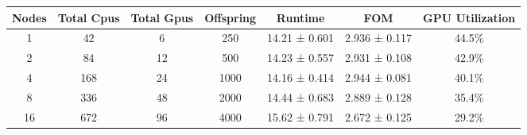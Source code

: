 \begin{tabular}{|c|c|c|c|c|c|c|}
\toprule
 Nodes &  Total Cpus &  Total Gpus &  Offspring &       Runtime &           FOM & GPU Utilization \\
\midrule
     1 &          42 &           6 &        250 & 14.21 ± 0.601 & 2.936 ± 0.117 &           44.5\% \\
     2 &          84 &          12 &        500 & 14.23 ± 0.557 & 2.931 ± 0.108 &           42.9\% \\
     4 &         168 &          24 &       1000 & 14.16 ± 0.414 & 2.944 ± 0.081 &           40.1\% \\
     8 &         336 &          48 &       2000 & 14.44 ± 0.683 & 2.889 ± 0.128 &           35.4\% \\
    16 &         672 &          96 &       4000 & 15.62 ± 0.791 & 2.672 ± 0.125 &           29.2\% \\
\bottomrule
\end{tabular}
